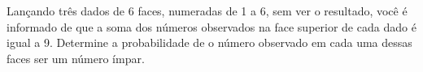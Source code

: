 %
%


\begin{exercicioBanco}[\valorquestao]

Lançando três dados de 6 faces, numeradas de 1 a 6, sem ver o resultado, você é informado de que a soma dos números observados na face superior de cada dado é igual a 9. Determine a probabilidade de o número observado em cada uma dessas faces ser um número ímpar.

\end{exercicioBanco}


